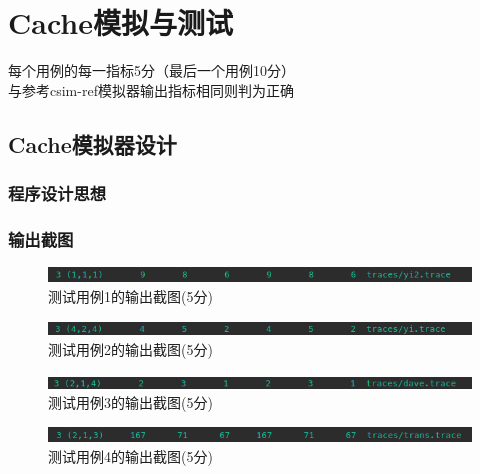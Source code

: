 \section{Cache模拟与测试}
\begin{center}
    每个用例的每一指标5分（最后一个用例10分）\\
    与参考csim-ref模拟器输出指标相同则判为正确
\end{center}

\subsection{Cache模拟器设计}


\subsubsection{程序设计思想}

\subsubsection{输出截图}

\begin{figure}[H]
    \centering
    \includegraphics[width=0.7\linewidth]{figures/CSim_1}
    \caption{测试用例1的输出截图(5分)}
    \label{fig:csim1}
\end{figure}

\begin{figure}[H]
    \centering
    \includegraphics[width=0.7\linewidth]{figures/CSim_2}
    \caption{测试用例2的输出截图(5分)}
    \label{fig:csim2}
\end{figure}

\begin{figure}[H]
    \centering
    \includegraphics[width=0.7\linewidth]{figures/CSim_3}
    \caption{测试用例3的输出截图(5分)}
    \label{fig:csim3}
\end{figure}

\begin{figure}[H]
    \centering
    \includegraphics[width=0.7\linewidth]{figures/CSim_4}
    \caption{测试用例4的输出截图(5分)}
    \label{fig:csim4}
\end{figure}

